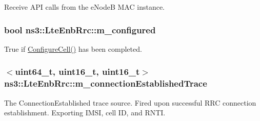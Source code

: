 Receive A\+PI calls from the e\+NodeB M\+AC instance. 

\subsubsection[{\texorpdfstring{m\+\_\+configured}{m_configured}}]{\setlength{\rightskip}{0pt plus 5cm}bool ns3\+::\+Lte\+Enb\+Rrc\+::m\+\_\+configured\hspace{0.3cm}{\ttfamily [private]}}\hypertarget{classns3_1_1LteEnbRrc_ac0a7069618bcc3daeb99c6aac864509e}{}\label{classns3_1_1LteEnbRrc_ac0a7069618bcc3daeb99c6aac864509e}


True if \hyperlink{classns3_1_1LteEnbRrc_a28baabf29624b37f55d017665be407c0}{Configure\+Cell()} has been completed. 

\subsubsection[{\texorpdfstring{m\+\_\+connection\+Established\+Trace}{m_connectionEstablishedTrace}}]{$<$uint64\+\_\+t, uint16\+\_\+t, uint16\+\_\+t$>$ ns3\+::\+Lte\+Enb\+Rrc\+::m\+\_\+connection\+Established\+Trace\hspace{0.3cm}{\ttfamily [private]}}\hypertarget{classns3_1_1LteEnbRrc_af189365b7174515e14d078971bc56990}{}\label{classns3_1_1LteEnbRrc_af189365b7174515e14d078971bc56990}
The {\ttfamily Connection\+Established} trace source. Fired upon successful R\+RC connection establishment. Exporting I\+M\+SI, cell ID, and R\+N\+TI. 
